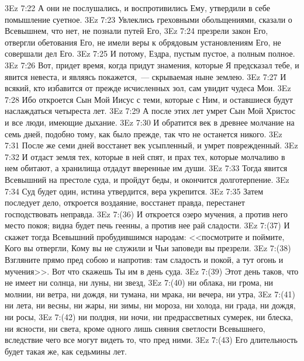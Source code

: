 \vs 3Ez 7:22 А они не послушались, и воспротивились Ему, утвердили в себе помышление суетное.
\vs 3Ez 7:23 Увлеклись греховными обольщениями, сказали о Всевышнем, что  нет, не познали путей Его,
\vs 3Ez 7:24 презрели закон Его, отвергли обетования Его, не имели веры к обрядовым установлениям Его, не совершали дел Его.
\vs 3Ez 7:25 И потому, Ездра, пустым пустое, а полным полное.
\vs 3Ez 7:26 Вот, придет время, когда придут знамения, которые Я предсказал тебе, и явится невеста, и являясь покажется,~--- скрываемая ныне землею.
\vs 3Ez 7:27 И всякий, кто избавится от прежде исчисленных зол, сам увидит чудеса Мои.
\vs 3Ez 7:28 Ибо откроется Сын Мой Иисус с теми, которые с Ним, и оставшиеся будут наслаждаться четыреста лет.
\vs 3Ez 7:29 А после этих лет умрет Сын Мой Христос и все люди, имеющие дыхание.
\vs 3Ez 7:30 И обратится век в древнее молчание на семь дней, подобно тому, как было прежде, так что не останется никого.
\vs 3Ez 7:31 После же семи дней восстанет век усыпленный, и умрет поврежденный.
\vs 3Ez 7:32 И отдаст земля тех, которые в ней спят, и прах тех, которые молчаливо в нем обитают, а хранилища отдадут вверенные им души.
\vs 3Ez 7:33 Тогда явится Всевышний на престоле суда, и пройдут беды, и окончится долготерпение.
\vs 3Ez 7:34 Суд будет один, истина утвердится, вера укрепится.
\vs 3Ez 7:35 Затем последует дело, откроется воздаяние, восстанет правда, перестанет господствовать неправда.
\vs 3Ez 7:(36) И откроется озеро мучения, а против него место покоя; видна будет печь геенны, а против нее рай сладости.
\vs 3Ez 7:(37) И скажет тогда Всевышний пробудившимся народам: <<посмотрите и поймите, Кого вы отвергли, Кому вы не служили и Чьи заповеди вы презрели.
\vs 3Ez 7:(38) Взгляните прямо пред собою и напротив: там сладость и покой, а тут огонь и мучения>>. Вот что скажешь Ты им в день суда.
\vs 3Ez 7:(39) Этот день таков, что не имеет ни солнца, ни луны, ни звезд,
\vs 3Ez 7:(40) ни облака, ни грома, ни молнии, ни ветра, ни дождя, ни тумана, ни мрака, ни вечера, ни утра,
\vs 3Ez 7:(41) ни лета, ни весны, ни жары, ни зимы, ни мороза, ни холода, ни града, ни дождя, ни росы,
\vs 3Ez 7:(42) ни полдня, ни ночи, ни предрассветных сумерек, ни блеска, ни ясности, ни света, кроме одного лишь сияния светлости Всевышнего, вследствие чего все могут видеть то, что пред ними.
\vs 3Ez 7:(43) Его длительность будет такая же, как седьмины лет.
